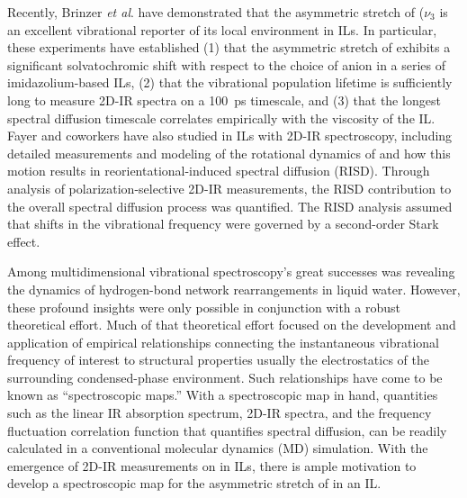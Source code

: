 Recently, Brinzer \emph{et al}. have demonstrated that the asymmetric stretch of  (\(\nu_3\) is an excellent vibrational reporter of its local environment in ILs.\cite{Brinzer2015} In particular, these experiments have established (1) that the asymmetric stretch of  exhibits a significant solvatochromic shift with respect to the choice of anion in a series of imidazolium-based ILs, (2) that the  vibrational population lifetime is sufficiently long to measure 2D-IR spectra on a \SI{100}{\pico\second} timescale, and (3) that the longest spectral diffusion timescale correlates empirically with the viscosity of the IL.\cite{Brinzer2015} Fayer and coworkers have also studied  in ILs with 2D-IR spectroscopy, including detailed measurements and modeling of the rotational dynamics of  and how this motion results in reorientational-induced spectral diffusion (RISD). Through analysis of polarization-selective 2D-IR measurements, the RISD contribution to the overall spectral diffusion process was quantified.\cite{Giammanco2016d,Giammanco2016} The RISD analysis assumed that shifts in the  vibrational frequency were governed by a second-order Stark effect.

Among multidimensional vibrational spectroscopy's great successes was revealing the dynamics of hydrogen-bond network rearrangements in liquid water.\cite{asburyJCP-04,Asbury2004,Bakker2010,feckoSci-03,eavesPNAS-05,Gruenbaum2013,Jansen2010,loparoJCP-06a,loparoJCP-06b,Nibbering2004,Nicodemus2011,nicodemusJPCL-10,ramaseshaJCP-11,Roberts2009} However, these profound insights were only possible in conjunction with a robust theoretical effort.\cite{Lee2011,feckoSci-03,eavesPNAS-05,Gruenbaum2013,auer_hydrogen_2007,auer_ir_2008,corcelliJCP-04a,Hayashi2005,Jansen2009,Li2010,Chai2008,lin_water_2009-1,Paarmann2009,Pieniazek2009,shiJPCB-12,Skinner2009,52,53,54,55,56,57,58,59} Much of that theoretical effort focused on the development and application of empirical relationships connecting the instantaneous vibrational frequency of interest to structural properties \textemdash{} usually the electrostatics \textemdash{} of the surrounding condensed-phase environment.\cite{steinelCPL-04,auer_ir_2008,Li2006} Such relationships have come to be known as ``spectroscopic maps.'' With a spectroscopic map in hand, quantities such as the linear IR absorption spectrum, 2D-IR spectra, and the frequency fluctuation correlation function that quantifies spectral diffusion, can be readily calculated in a conventional molecular dynamics (MD) simulation.\cite{lin_water_2009-1,Li2006,61} With the emergence of 2D-IR measurements on  in ILs, there is ample motivation to develop a spectroscopic map for the asymmetric stretch of  in an IL.

